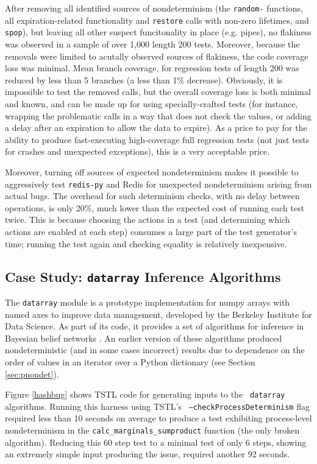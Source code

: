 After removing all identified sources of nondeterminism (the {\tt random-} functions, all
expiration-related functionality and {\tt restore} calls with non-zero
lifetimes, and {\tt spop}), but leaving all other suspect funcitonality in
place (e.g. pipes), no flakiness was observed in a sample of over 1,000 length
200 tests.  Moreover, because the removals were limited to acutally
observed sources of flakiness, the code coverage loss was minimal.
Mean branch coverage, for regression tests of length 200 was reduced
by less than 5 branches (a less than 1\% decrease).  Obviously, it is
impossible to test the removed calls, but the overall coverage loss is
both minimal and known, and can be made up for using specially-crafted
tests (for instance, wrapping the problematic calls in a way that does
not check the values, or adding a delay after an expiration to allow
the data to expire).  As a price to pay for the ability to produce
fast-executing high-coverage full regression tests (not just tests for
crashes and unexpected exceptions), this is a very acceptable price.

Moreover, turning off sources of expected nondeterminism makes
it possible to aggressively test {\tt redis-py} and Redis for
unexpected nondeterminism arising from actual bugs.  The overhead for such
determinism checks, with no delay between operations, is only
20\%, much lower than the expected cost of running each test twice.
This is because choosing the actions in a test (and determining which
actions are enabled at each step) consumes a large part of the test
generator's time; running the test again and checking equality is
relatively inexpensive.  

\subsection{Case Study: {\tt datarray} Inference Algorithms}

The {\tt datarray} module \cite{datarray} is a prototype
implementation for numpy arrays with named axes to improve data
management, developed by the Berkeley Institute for Data Science.  As part of its code, it provides a set of algorithms for
inference in
Bayesian belief networks \cite{russell2016artificial}.  An earlier
version of these algorithms produced nondeterministic (and in some
cases incorrect) results due to dependence on the order of values in
an iterator over a Python dictionary (see Section \ref{sec:pnondet}).

Figure \ref{hashbug} shows TSTL code for generating inputs to the {\tt
  datarray} algorithms.  Running this harness using TSTL's {\tt
  --checkProcessDeterminism} flag required less than 10 seconds on
average to produce a test exhibiting process-level nondeterminism in
the {\tt calc\_marginals\_sumproduct} function (the only broken
algorithm).  Reducing this 60 step test to a minimal test of only 6 steps,
showing an extremely simple input producing the issue, 
required another 92 seconds.

